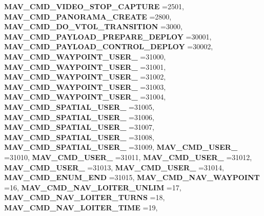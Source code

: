 \begin{DoxyCompactItemize}
\textbf{ M\+A\+V\+\_\+\+C\+M\+D\+\_\+\+V\+I\+D\+E\+O\+\_\+\+S\+T\+O\+P\+\_\+\+C\+A\+P\+T\+U\+RE} =2501, 
\newline
\textbf{ M\+A\+V\+\_\+\+C\+M\+D\+\_\+\+P\+A\+N\+O\+R\+A\+M\+A\+\_\+\+C\+R\+E\+A\+TE} =2800, 
\textbf{ M\+A\+V\+\_\+\+C\+M\+D\+\_\+\+D\+O\+\_\+\+V\+T\+O\+L\+\_\+\+T\+R\+A\+N\+S\+I\+T\+I\+ON} =3000, 
\textbf{ M\+A\+V\+\_\+\+C\+M\+D\+\_\+\+P\+A\+Y\+L\+O\+A\+D\+\_\+\+P\+R\+E\+P\+A\+R\+E\+\_\+\+D\+E\+P\+L\+OY} =30001, 
\textbf{ M\+A\+V\+\_\+\+C\+M\+D\+\_\+\+P\+A\+Y\+L\+O\+A\+D\+\_\+\+C\+O\+N\+T\+R\+O\+L\+\_\+\+D\+E\+P\+L\+OY} =30002, 
\newline
\textbf{ M\+A\+V\+\_\+\+C\+M\+D\+\_\+\+W\+A\+Y\+P\+O\+I\+N\+T\+\_\+\+U\+S\+E\+R\+\_} =31000, 
\textbf{ M\+A\+V\+\_\+\+C\+M\+D\+\_\+\+W\+A\+Y\+P\+O\+I\+N\+T\+\_\+\+U\+S\+E\+R\+\_} =31001, 
\textbf{ M\+A\+V\+\_\+\+C\+M\+D\+\_\+\+W\+A\+Y\+P\+O\+I\+N\+T\+\_\+\+U\+S\+E\+R\+\_} =31002, 
\textbf{ M\+A\+V\+\_\+\+C\+M\+D\+\_\+\+W\+A\+Y\+P\+O\+I\+N\+T\+\_\+\+U\+S\+E\+R\+\_} =31003, 
\newline
\textbf{ M\+A\+V\+\_\+\+C\+M\+D\+\_\+\+W\+A\+Y\+P\+O\+I\+N\+T\+\_\+\+U\+S\+E\+R\+\_} =31004, 
\textbf{ M\+A\+V\+\_\+\+C\+M\+D\+\_\+\+S\+P\+A\+T\+I\+A\+L\+\_\+\+U\+S\+E\+R\+\_} =31005, 
\textbf{ M\+A\+V\+\_\+\+C\+M\+D\+\_\+\+S\+P\+A\+T\+I\+A\+L\+\_\+\+U\+S\+E\+R\+\_} =31006, 
\textbf{ M\+A\+V\+\_\+\+C\+M\+D\+\_\+\+S\+P\+A\+T\+I\+A\+L\+\_\+\+U\+S\+E\+R\+\_} =31007, 
\newline
\textbf{ M\+A\+V\+\_\+\+C\+M\+D\+\_\+\+S\+P\+A\+T\+I\+A\+L\+\_\+\+U\+S\+E\+R\+\_} =31008, 
\textbf{ M\+A\+V\+\_\+\+C\+M\+D\+\_\+\+S\+P\+A\+T\+I\+A\+L\+\_\+\+U\+S\+E\+R\+\_} =31009, 
\textbf{ M\+A\+V\+\_\+\+C\+M\+D\+\_\+\+U\+S\+E\+R\+\_} =31010, 
\textbf{ M\+A\+V\+\_\+\+C\+M\+D\+\_\+\+U\+S\+E\+R\+\_} =31011, 
\newline
\textbf{ M\+A\+V\+\_\+\+C\+M\+D\+\_\+\+U\+S\+E\+R\+\_} =31012, 
\textbf{ M\+A\+V\+\_\+\+C\+M\+D\+\_\+\+U\+S\+E\+R\+\_} =31013, 
\textbf{ M\+A\+V\+\_\+\+C\+M\+D\+\_\+\+U\+S\+E\+R\+\_} =31014, 
\textbf{ M\+A\+V\+\_\+\+C\+M\+D\+\_\+\+E\+N\+U\+M\+\_\+\+E\+ND} =31015, 
\newline
\textbf{ M\+A\+V\+\_\+\+C\+M\+D\+\_\+\+N\+A\+V\+\_\+\+W\+A\+Y\+P\+O\+I\+NT} =16, 
\textbf{ M\+A\+V\+\_\+\+C\+M\+D\+\_\+\+N\+A\+V\+\_\+\+L\+O\+I\+T\+E\+R\+\_\+\+U\+N\+L\+IM} =17, 
\textbf{ M\+A\+V\+\_\+\+C\+M\+D\+\_\+\+N\+A\+V\+\_\+\+L\+O\+I\+T\+E\+R\+\_\+\+T\+U\+R\+NS} =18, 
\textbf{ M\+A\+V\+\_\+\+C\+M\+D\+\_\+\+N\+A\+V\+\_\+\+L\+O\+I\+T\+E\+R\+\_\+\+T\+I\+ME} =19, 
\newline

\end{DoxyCompactItemize}

